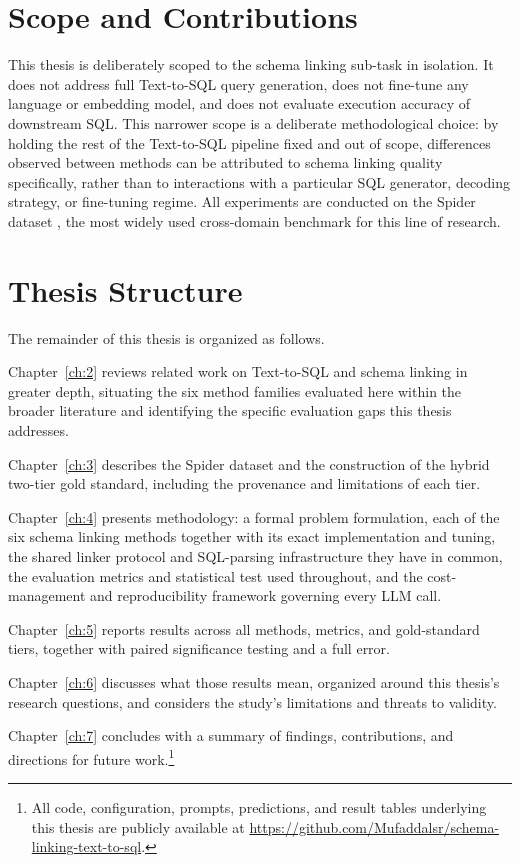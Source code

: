 \section{Scope and Contributions}\label{sec:1-3}

This thesis is deliberately scoped to the schema linking sub-task in isolation. It does not address full Text-to-SQL query generation, does not fine-tune any language or embedding model, and does not evaluate execution accuracy of downstream SQL. This narrower scope is a deliberate methodological choice: by holding the rest of the Text-to-SQL pipeline fixed and out of scope, differences observed between methods can be attributed to schema linking quality specifically, rather than to interactions with a particular SQL generator, decoding strategy, or fine-tuning regime. All experiments are conducted on the Spider dataset \citep{yu2018}, the most widely used cross-domain benchmark for this line of research.

\section{Thesis Structure}\label{sec:1-4}

The remainder of this thesis is organized as follows.

Chapter~\ref{ch:2} reviews related work on Text-to-SQL and schema linking in greater depth, situating the six method families evaluated here within the broader literature and identifying the specific evaluation gaps this thesis addresses.

Chapter~\ref{ch:3} describes the Spider dataset and the construction of the hybrid two-tier gold standard, including the provenance and limitations of each tier.

Chapter~\ref{ch:4} presents methodology: a formal problem formulation, each of the six schema linking methods together with its exact implementation and tuning, the shared linker protocol and SQL-parsing infrastructure they have in common, the evaluation metrics and statistical test used throughout, and the cost-management and reproducibility framework governing every LLM call.

Chapter~\ref{ch:5} reports results across all methods, metrics, and gold-standard tiers, together with paired significance testing and a full error.

Chapter~\ref{ch:6} discusses what those results mean, organized around this thesis's research questions, and considers the study's limitations and threats to validity.

\enlargethispage{4\baselineskip}
Chapter~\ref{ch:7} concludes with a summary of findings, contributions, and directions for future work.\footnote{All code, configuration, prompts, predictions, and result tables underlying this thesis are publicly available at \url{https://github.com/Mufaddalsr/schema-linking-text-to-sql}.}
